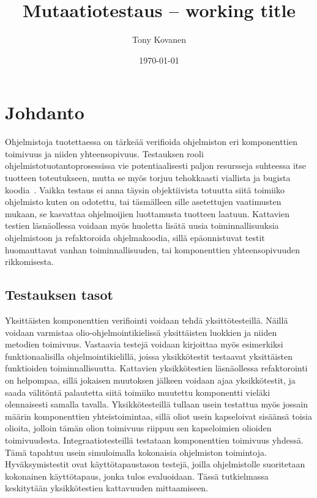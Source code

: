 \documentclass{tktltiki}
\begin{document}
\onehalfspacing

\title{Mutaatiotestaus -- working title}
\author{Tony Kovanen}
\date{\today}

\maketitle



\mytableofcontents

\section{Johdanto}
Ohjelmistoja tuotettaessa on tärkeää verifioida ohjelmiston eri komponenttien toimivuus ja niiden yhteensopivuus. Testauksen rooli ohjelmistotuotantoprosessissa vie potentiaalisesti paljon resursseja suhteessa itse tuotteen toteutukseen, mutta se myös torjuu tehokkaasti viallista ja bugista koodia~\cite{}. Vaikka testaus ei anna täysin objektiivista totuutta siitä toimiiko ohjelmisto kuten on odotettu, tai täsmälleen sille asetettujen vaatimusten mukaan, se kasvattaa ohjelmoijien luottamusta tuotteen laatuun. Kattavien testien läsnäollessa voidaan myös huoletta lisätä uusia toiminnallisuuksia ohjelmistoon ja refaktoroida ohjelmakoodia, sillä epäonnistuvat testit huomauttavat vanhan toiminnallisuuden, tai komponenttien yhteensopivuuden rikkomisesta. 

\subsection{Testauksen tasot}
Yksittäisten komponenttien verifiointi voidaan tehdä yksittötesteillä. Näillä voidaan varmistaa olio-ohjelmointikielissä yksittäisten luokkien ja niiden metodien toimivuus. Vastaavia testejä voidaan kirjoittaa myös esimerkiksi funktionaalisilla ohjelmointikielillä, joissa yksikkötestit testaavat yksittäisten funktioiden toiminnallisuutta. Kattavien yksikkötestien läsnäollessa refaktorointi on helpompaa, sillä jokaisen muutoksen jälkeen voidaan ajaa yksikkötestit, ja saada välitöntä palautetta siitä toimiiko muutettu komponentti vieläki olennaisesti samalla tavalla. Yksikkötesteillä tullaan usein testattua myös jossain määrin komponenttien yhteistoimintaa, sillä oliot usein kapseloivat sisäänsä toisia olioita, jolloin tämän olion toimivuus riippuu sen kapseloimien olioiden toimivuudesta. Integraatiotesteillä testataan komponenttien toimivuus yhdessä. Tämä tapahtuu usein simuloimalla kokonaisia ohjelmiston toimintoja. Hyväksymistestit ovat käyttötapaustason testejä, joilla ohjelmistolle suoritetaan kokonainen käyttötapaus, jonka tulos evaluoidaan. Tässä tutkielmassa keskitytään yksikkötestien kattavuuden mittaamiseen.
\end{document}
